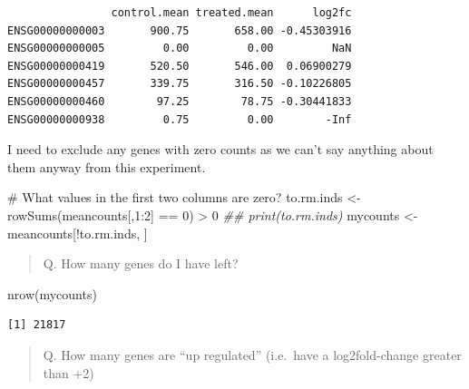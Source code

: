 \documentclass[
  letterpaper,
  DIV=11,
  numbers=noendperiod]{scrartcl}
\newenvironment{Shaded}{\begin{snugshade}}{\end{snugshade}}
\newcommand{\CommentTok}[1]{\textcolor[rgb]{0.37,0.37,0.37}{#1}}
\newcommand{\DecValTok}[1]{\textcolor[rgb]{0.68,0.00,0.00}{#1}}
\newcommand{\DocumentationTok}[1]{\textcolor[rgb]{0.37,0.37,0.37}{\textit{#1}}}
\newcommand{\FunctionTok}[1]{\textcolor[rgb]{0.28,0.35,0.67}{#1}}
\newcommand{\NormalTok}[1]{\textcolor[rgb]{0.00,0.23,0.31}{#1}}
\newcommand{\OtherTok}[1]{\textcolor[rgb]{0.00,0.23,0.31}{#1}}
\newcommand{\SpecialCharTok}[1]{\textcolor[rgb]{0.37,0.37,0.37}{#1}}
\begin{document}
\begin{verbatim}
                control.mean treated.mean      log2fc
ENSG00000000003       900.75       658.00 -0.45303916
ENSG00000000005         0.00         0.00         NaN
ENSG00000000419       520.50       546.00  0.06900279
ENSG00000000457       339.75       316.50 -0.10226805
ENSG00000000460        97.25        78.75 -0.30441833
ENSG00000000938         0.75         0.00        -Inf
\end{verbatim}

I need to exclude any genes with zero counts as we can't say anything
about them anyway from this experiment.

\begin{Shaded}
\begin{Highlighting}[]
\CommentTok{\# What values in the first two columns are zero?}
\NormalTok{to.rm.inds }\OtherTok{\textless{}{-}} \FunctionTok{rowSums}\NormalTok{(meancounts[,}\DecValTok{1}\SpecialCharTok{:}\DecValTok{2}\NormalTok{] }\SpecialCharTok{==} \DecValTok{0}\NormalTok{) }\SpecialCharTok{\textgreater{}} \DecValTok{0}
\DocumentationTok{\#\# print(to.rm.inds)}
\NormalTok{mycounts }\OtherTok{\textless{}{-}}\NormalTok{ meancounts[}\SpecialCharTok{!}\NormalTok{to.rm.inds, ]}
\end{Highlighting}
\end{Shaded}

\begin{quote}
Q. How many genes do I have left?
\end{quote}

\begin{Shaded}
\begin{Highlighting}[]
\FunctionTok{nrow}\NormalTok{(mycounts)}
\end{Highlighting}
\end{Shaded}

\begin{verbatim}
[1] 21817
\end{verbatim}

\begin{quote}
Q. How many genes are ``up regulated'' (i.e.~have a log2fold-change
greater than +2)
\end{quote}

\begin{Shaded}
\end{Shaded}
\end{document}
